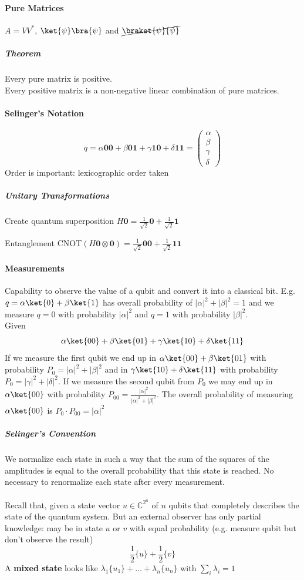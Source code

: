 \documentclass[10pt]{report}
\begin{document}
\paragraph{Pure Matrices} $A = VV^*$, $\ket{\psi}\bra{\psi}$ and $\cancel{\braket{\psi}{\psi}}$
\subparagraph{Theorem} Every pure matrix is positive.\\
Every positive matrix is a non-negative linear combination of pure matrices.
\paragraph{Selinger's Notation}
$$q = \alpha\mathbf{00} + \beta\mathbf{01} + \gamma\mathbf{10} + \delta\mathbf{11} = \left(\begin{array}{c}
\alpha\\\beta\\\gamma\\\delta
\end{array}\right)$$
Order is important: lexicographic order taken
\subparagraph{Unitary Transformations}
\begin{list}{}{}
	\item Create quantum superposition $H\mathbf{0} = \frac{1}{\sqrt{2}}\mathbf{0} + \frac{1}{\sqrt{2}}\mathbf{1}$
	\item Entanglement CNOT$(H\mathbf{0}\otimes\mathbf{0})=\frac{1}{\sqrt{2}}\mathbf{00}+\frac{1}{\sqrt{2}}\mathbf{11}$
\end{list}
\paragraph{Measurements} Capability to observe the value of a qubit and convert it into a classical bit. E.g. $q = \alpha\ket{0}+\beta\ket{1}$ has overall probability of $|\alpha|^2+|\beta|^2=1$ and we measure $q=0$ with probability $|\alpha|^2$ and $q=1$ with probability $|\beta|^2$.\\
Given 
$$\alpha\ket{00}+\beta\ket{01}+\gamma\ket{10}+\delta\ket{11}$$
If we measure the first qubit we end up in $\alpha\ket{00}+\beta\ket{01}$ with probability $P_0=|\alpha|^2+|\beta|^2$ and in $\gamma\ket{10}+\delta\ket{11}$ with probability $P_0=|\gamma|^2+|\delta|^2$. If we measure the second qubit from $P_0$ we may end up in $\alpha\ket{00}$ with probability $P_{00} = \frac{|\alpha|^2}{|\alpha|^2+|\beta|^2}$. The overall probability of measuring $\alpha\ket{00}$ is $P_{0}\cdot P_{00} = |\alpha|^2$
\subparagraph{Selinger's Convention} We normalize each state in such a way that the sum of the squares of the amplitudes is equal to the overall probability that this state is reached. No necessary to renormalize each state after every measurement.\\\\
Recall that, given a state vector $u\in \mathbb{C}^{2^n}$ of $n$ qubits that completely describes the state of the quantum system. But an external observer has only partial knowledge: may be in state $u$ or $v$ with equal probability (e.g. measure qubit but don't observe the result)
$$\frac{1}{2}\{u\}+\frac{1}{2}\{v\}$$
A \textbf{mixed state} looks like $\lambda_1\{u_1\}+\ldots+\lambda_n\{u_n\}$ with $\sum_i \lambda_i = 1$
\end{document}
